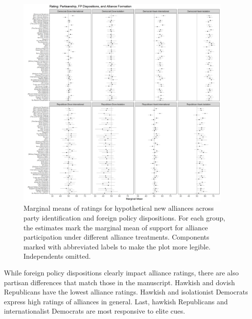 \documentclass[12pt]{article}
\begin{document}
\begin{figure}
	\centering
		\includegraphics[width=0.95\textwidth]{party-dispo-formapp.png}
	\caption{Marginal means of ratings for hypothetical new alliances across party identification and foreign policy dispositions. For each group, the estimates mark the marginal mean of support for alliance participation under different alliance treatments. Components marked with abbreviated labels to make the plot more legible. Independents omitted.}
	\label{fig:party-dispo-form}
\end{figure}


While foreign policy dispositions clearly impact alliance ratings, there are also partisan differences that match those in the manuscript. 
Hawkish and dovish Republicans have the lowest alliance ratings. 
Hawkish and isolationist Democrats express high ratings of alliances in general.  
Last, hawkish Republicans and internationalist Democrats are most responsive to elite cues. 
\end{document}
